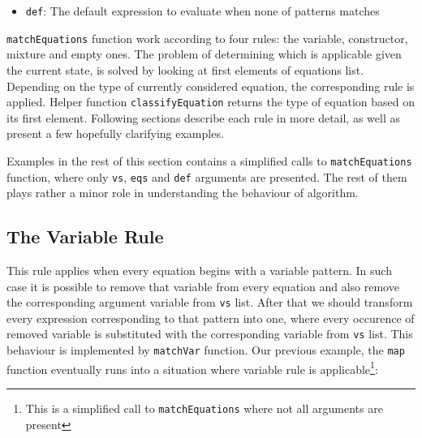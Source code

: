 \documentclass[12pt,a4paper]{report}
\begin{document}
\begin{itemize}
\vspace*{0.2in}
\begin{code}[style=haskell]
ECaseConstr ((EConstr 3 2 (ENum 1)) (EConstr 2 0))
            [(PConstr 2 0 [], ENum 0),
             (PConstr 3 2 [PVar x, PVar xs], EVar x)]
\end{code}

\texttt{Pattern} type instances on the other hand represents patterns itself.
Patterns might be numbers, variables, constructors or special entities standing
for patterns chosen when none of other branches match. Below, the definition of
\texttt{Pattern} type is presented:

\vspace*{0.2in}
\begin{code}[style=haskell]
data Pattern = PNum Int
             | PVar Name
             | PChar Int
             | PConstrName Name [Pattern]
             | PConstr Int Int [Pattern]
             | PDefault
\end{code}


  \item \texttt{def}: The default expression to evaluate when none of patterns
    matches
\end{itemize}

\texttt{matchEquations} function work according to four rules: the variable,
constructor, mixture and empty ones. The problem of determining which is
applicable given the current state, is solved by looking at first elements of
equations list. Depending on the type of currently considered equation, the
corresponding rule is applied. Helper function \texttt{classifyEquation}
returns the type of equation based on its first element. Following sections
describe each rule in more detail, as well as present a few hopefully
clarifying examples.

Examples in the rest of this section contains a simplified calls to
\texttt{matchEquations} function, where only \texttt{vs}, \texttt{eqs} and
\texttt{def} arguments are presented. The rest of them plays rather a minor
role in understanding the behaviour of algorithm.


\subsection{The Variable Rule}
This rule applies when every equation begins with a variable pattern. In such
case it is possible to remove that variable from every equation and also remove
the corresponding argument variable from \texttt{vs} list. After that we should
transform every expression corresponding to that pattern into one, where every
occurence of removed variable is substituted with the corresponding variable
from \texttt{vs} list. This behaviour is implemented by \texttt{matchVar}
function.
Our previous example, the \texttt{map} function eventually runs into a situation
where variable rule is applicable\footnote{This is a simplified call to
\texttt{matchEquations} where not all arguments are present}:
\end{document}
